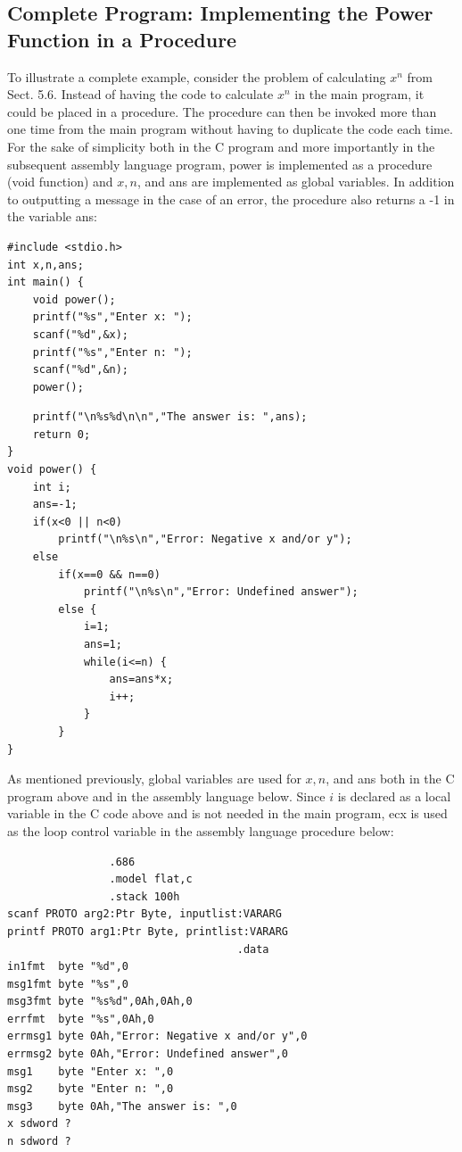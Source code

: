 \documentclass[10pt]{book}
\begin{document}
\subsection{Complete Program: Implementing the Power Function in a Procedure}
To illustrate a complete example, consider the problem of calculating $x^{n}$ from Sect. 5.6. Instead of having the code to calculate $x^{n}$ in the main program, it could be placed in a procedure. The procedure can then be invoked more than one time from the main program without having to duplicate the code each time. For the sake of simplicity both in the C program and more importantly in the subsequent assembly language program, power is implemented as a procedure (void function) and $x, n$, and ans are implemented as global variables. In addition to outputting a message in the case of an error, the procedure also returns a -1 in the variable ans:

\begin{verbatim}
#include <stdio.h>
int x,n,ans;
int main() {
    void power();
    printf("%s","Enter x: ");
    scanf("%d",&x);
    printf("%s","Enter n: ");
    scanf("%d",&n);
    power();
\end{verbatim}

\begin{verbatim}
    printf("\n%s%d\n\n","The answer is: ",ans);
    return 0;
}
void power() {
    int i;
    ans=-1;
    if(x<0 || n<0)
        printf("\n%s\n","Error: Negative x and/or y");
    else
        if(x==0 && n==0)
            printf("\n%s\n","Error: Undefined answer");
        else {
            i=1;
            ans=1;
            while(i<=n) {
                ans=ans*x;
                i++;
            }
        }
}
\end{verbatim}

As mentioned previously, global variables are used for $x, n$, and ans both in the C program above and in the assembly language below. Since $i$ is declared as a local variable in the C code above and is not needed in the main program, ecx is used as the loop control variable in the assembly language procedure below:

\begin{verbatim}
                .686
                .model flat,c
                .stack 100h
scanf PROTO arg2:Ptr Byte, inputlist:VARARG
printf PROTO arg1:Ptr Byte, printlist:VARARG
                                    .data
in1fmt  byte "%d",0
msg1fmt byte "%s",0
msg3fmt byte "%s%d",0Ah,0Ah,0
errfmt  byte "%s",0Ah,0
errmsg1 byte 0Ah,"Error: Negative x and/or y",0
errmsg2 byte 0Ah,"Error: Undefined answer",0
msg1    byte "Enter x: ",0
msg2    byte "Enter n: ",0
msg3    byte 0Ah,"The answer is: ",0
x sdword ?
n sdword ?
\end{verbatim}
\end{document}
